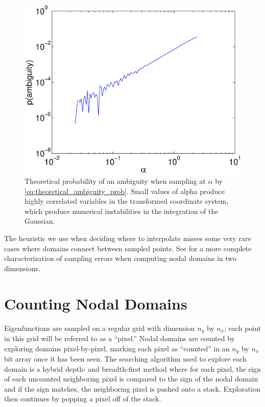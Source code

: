 \documentclass{report}
\begin{document}
\begin{figure}
  \begin{center}
  \includegraphics[width=\textwidth]{figs/interpolation/theoretical_ambiguity_prob.eps}
  \caption{Theoretical probability of an ambiguity when sampling at $\alpha$ by \ref{eq:theoretical_ambiguity_prob}. Small values of alpha produce highly correlated variables in the transformed coordinate system, which produce numerical instabilities in the integration of the Gaussian.}
  \label{fig:theoretical_ambiguity_prob}
  \end{center}
\end{figure}

The heuristic we use when deciding where to interpolate misses some very rare cases where domains connect between sampled points. See \cite{mischaikow} for a more complete characterization of sampling errors when computing nodal domains in two dimensions.

\section{Counting Nodal Domains}
\label{sec:counting}
Eigenfunctions are sampled on a regular grid with dimension $n_{y}$ by $n_{x}$; each point in this grid will be referred to as a ``pixel.'' Nodal domains are counted by exploring domains pixel-by-pixel, marking each pixel as ``counted'' in an $n_{y}$ by $n_{x}$ bit array once it has been seen. The searching algorithm used to explore each domain is a hybrid depth- and breadth-first method where for each pixel, the sign of each uncounted neighboring pixel is compared to the sign of the nodal domain and if the sign matches, the neighboring pixel is pushed onto a stack. Exploration then continues by popping a pixel off of the stack.
\end{document}
